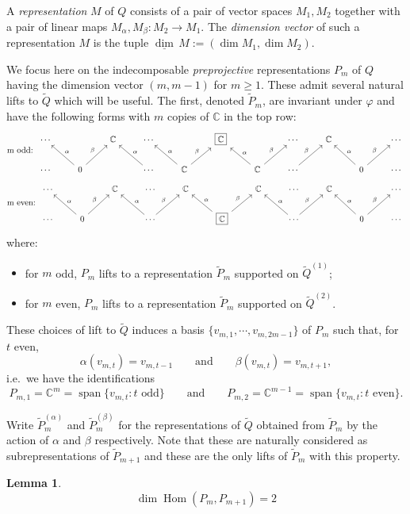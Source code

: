\documentclass{amsart}
\newtheorem{lemma}[theorem]{Lemma}
\numberwithin{equation}{section}
\newcommand{\CC}{\mathbb{C}}
\newcommand{\Hom}{\operatorname{Hom}}
\newcommand{\Span}{\operatorname{span}}
\newcommand{\udim}{\underline{\dim}\,}
\begin{document}
  A \emph{representation} $M$ of $Q$ consists of a pair of vector spaces $M_1,M_2$ together with a pair of linear maps $M_\alpha,M_\beta:M_2\to M_1$.
  The \emph{dimension vector} of such a representation $M$ is the tuple $\udim M:=(\dim M_1,\dim M_2)$.

  We focus here on the indecomposable \emph{preprojective} representations $P_m$ of $Q$ having the dimension vector $(m,m-1)$ for $m\ge1$.
  These admit several natural lifts to $\widetilde Q$ which will be useful.
  The first, denoted $\widetilde P_m$, are invariant under $\varphi$ and have the following forms with $m$ copies of $\CC$ in the top row:
  \[
    \text{m odd: }
    \begin{tikzcd}
      \cdots & & \CC & \cdots & & \fbox{$\CC$} & & \cdots & \CC & & \cdots \\
      \cdots & 0 \arrow["\alpha"']{ul} \arrow["\beta"]{ur} & & \cdots \arrow["\alpha"']{ul} & \CC \arrow["\alpha"']{ul} \arrow["\beta"]{ur} & & \CC \arrow["\alpha"']{ul} \arrow["\beta"]{ur} & \cdots \arrow["\beta"]{ur} & & 0 \arrow["\alpha"']{ul} \arrow["\beta"]{ur} & \cdots
    \end{tikzcd}
  \]
  \[
    \text{m even: }
    \begin{tikzcd}
      \cdots & & \CC & \cdots & \CC & & \CC & \cdots & \CC & & \cdots \\
      \cdots & 0 \arrow["\alpha"']{ul} \arrow["\beta"]{ur} & & \cdots \arrow["\alpha"']{ul} \arrow["\beta"]{ur} & & \fbox{$\CC$} \arrow["\alpha"']{ul} \arrow["\beta"]{ur} & & \cdots \arrow["\alpha"']{ul} \arrow["\beta"]{ur} & & 0 \arrow["\alpha"']{ul} \arrow["\beta"]{ur} & \cdots
    \end{tikzcd}
  \]
  where:
  \begin{itemize}
    \item for $m$ odd, $P_m$ lifts to a representation $\widetilde P_m$ supported on $\widetilde Q^{(1)}$;
    \item for $m$ even, $P_m$ lifts to a representation $\widetilde P_m$ supported on $\widetilde Q^{(2)}$.
  \end{itemize}

  These choices of lift to $\widetilde Q$ induces a basis $\{v_{m,1},\cdots,v_{m,2m-1}\}$ of $P_m$ such that, for $t$ even, 
  \[\alpha(v_{m,t})=v_{m,t-1} \qquad \text{and} \qquad \beta(v_{m,t})=v_{m,t+1},\]
  i.e.\ we have the identifications
  \[P_{m,1}=\CC^m=\Span\{v_{m,t}:\text{$t$ odd}\}\qquad\text{and}\qquad P_{m,2}=\CC^{m-1}=\Span\{v_{m,t}:\text{$t$ even}\}.\]

  Write $\widetilde P_m^{(\alpha)}$ and $\widetilde P_m^{(\beta)}$ for the representations of $\widetilde Q$ obtained from $\widetilde P_m$ by the action of $\alpha$ and $\beta$ respectively.
  Note that these are naturally considered as subrepresentations of $\widetilde P_{m+1}$ and these are the only lifts of $\widetilde P_m$ with this property.
  \begin{lemma}
    \[\dim\Hom(P_m,P_{m+1})=2\]
  \end{lemma}
\end{document}
